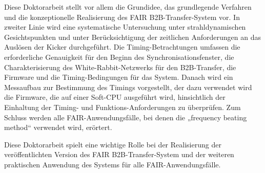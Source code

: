 Diese Doktorarbeit stellt vor allem die Grundidee, das grundlegende Verfahren und die konzeptionelle Realisierung des FAIR B2B-Transfer-System vor. In zweiter Linie wird eine systematische Untersuchung unter strahldynamischen Gesichtspunkten und unter
Ber\"ucksichtigung der zeitlichen Anforderungen an das Ausl\"osen der Kicker durchgef\"uhrt. Die Timing-Betrachtungen umfassen die erforderliche Genauigkeit f\"ur den Beginn des Synchronisationsfenster, die Charakterisierung des White-Rabbit-Netzwerks f\"ur den B2B-Transfer, die Firmware und die Timing-Bedingungen f\"ur das System. Danach wird ein Messaufbau zur Bestimmung des Timings vorgestellt, der dazu verwendet wird die Firmware, die auf einer Soft-CPU ausgef\"uhrt wird, hinsichtlich der Einhaltung der Timing- und Funktions-Anforderungen zu \"uberpr\"ufen. Zum Schluss werden alle FAIR-Anwendungsf\"alle, bei denen die „frequency beating method“ verwendet wird, er\"ortert.

Diese Doktorarbeit spielt eine wichtige Rolle bei der Realisierung der ver\"offentlichten Version des FAIR B2B-Transfer-System und der weiteren praktischen Anwendung des Systems f\"ur alle FAIR-Anwendungsf\"alle.

